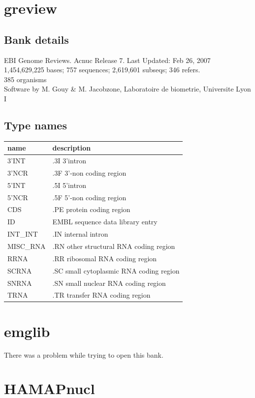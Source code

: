 \documentclass{article}
\begin{document}
\begin{Schunk}
\section{ greview }
\subsection{Bank details}
EBI Genome Reviews. Acnuc Release 7. Last Updated: Feb 26, 2007\\
1,454,629,225 bases; 757 sequences; 2,619,601 subseqs; 346 refers.\\
385 organisms\\
Software by M. Gouy \& M. Jacobzone, Laboratoire de biometrie, Universite Lyon I

\subsection{Type names}
\noindent\begin{tabular}{ll}
\hline \hline
name & description\\
\hline
3'INT & .3I 3'intron \\
3'NCR & .3F  3'-non coding region \\
5'INT & .5I 5'intron \\
5'NCR & .5F  5'-non coding region \\
CDS & .PE protein coding region \\
ID & EMBL sequence data library entry \\
INT\_INT & .IN  internal intron \\
MISC\_RNA & .RN other structural RNA coding region \\
RRNA & .RR ribosomal RNA coding region \\
SCRNA & .SC small cytoplasmic RNA coding region \\
SNRNA & .SN small nuclear RNA coding region \\
TRNA & .TR transfer RNA coding region \\
\hline \hline
\end{tabular}

\section{ emglib }
There was a problem while trying to open this bank.
\section{ HAMAPnucl }

\end{Schunk}
\end{document}
